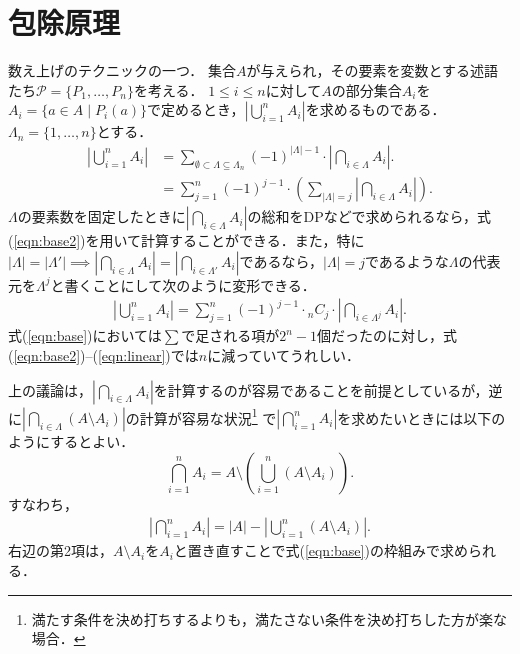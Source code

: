 \documentclass{jsarticle}
\begin{document}
\section{包除原理}

数え上げのテクニックの一つ．
集合$A$が与えられ，その要素を変数とする述語たち$\mathcal{P}=\{P_1, \dots, P_n\}$を考える．
$1\le i\le n$に対して$A$の部分集合$A_i$を$A_i=\{a\in A\mid P_i(a)\}$で定めるとき，$\left|\bigcup_{i=1}^n A_i\right|$を求めるものである．
$\Lambda_n=\{1, \dots, n\}$とする．
\begin{align}\label{eqn:base}
\left|\bigcup_{i=1}^n A_i\right|
&= \sum_{\emptyset\subset\Lambda\subseteq \Lambda_n} (-1)^{|\Lambda|-1}\cdot \left|\bigcap_{i\in\Lambda} A_i\right|.\\
\label{eqn:base2}
&= \sum_{j=1}^n (-1)^{j-1}\cdot \left(\sum_{|\Lambda|=j} \left|\bigcap_{i\in\Lambda} A_i\right|\right).
\end{align}
$\Lambda$の要素数を固定したときに$\left|\bigcap_{i\in\Lambda} A_i\right|$の総和をDPなどで求められるなら，式(\ref{eqn:base2})を用いて計算することができる．また，特に
$|\Lambda|=|\Lambda'|\implies\left|\bigcap_{i\in\Lambda}A_i\right| = \left|\bigcap_{i\in\Lambda'}A_i\right|$であるなら，$|\Lambda|=j$であるような$\Lambda$の代表元を$\Lambda^j$と書くことにして次のように変形できる．
\begin{align}\label{eqn:linear}
  \left|\bigcup_{i=1}^n A_i\right|
  = \sum_{j=1}^n (-1)^{j-1}\cdot {}_n C_j\cdot\left|\bigcap_{i\in\Lambda^j}A_i\right|.
\end{align}
式(\ref{eqn:base})においては$\sum$で足される項が$2^n-1$個だったのに対し，式(\ref{eqn:base2})--(\ref{eqn:linear})では$n$に減っていてうれしい．

上の議論は，$\left|\bigcap_{i\in\Lambda}A_i\right|$を計算するのが容易であることを前提としているが，逆に$\left|\bigcap_{i\in\Lambda}(A\setminus A_i)\right|$の計算が容易な状況\footnote{満たす条件を決め打ちするよりも，満たさない条件を決め打ちした方が楽な場合．}
で$\left|\bigcap_{i=1}^n A_i\right|$を求めたいときには以下のようにするとよい．
\[
\bigcap_{i=1}^n A_i = A\setminus\left(\bigcup_{i=1}^n (A\setminus A_i)\right).
\]
すなわち，
\begin{align}\label{eqn:cmpl}
  \left|\bigcap_{i=1}^n A_i\right| = |A|-\left|\bigcup_{i=1}^n (A\setminus A_i)\right|.
\end{align}
右辺の第2項は，$A\setminus A_i$を$A_i$と置き直すことで式(\ref{eqn:base})の枠組みで求められる．
\end{document}
